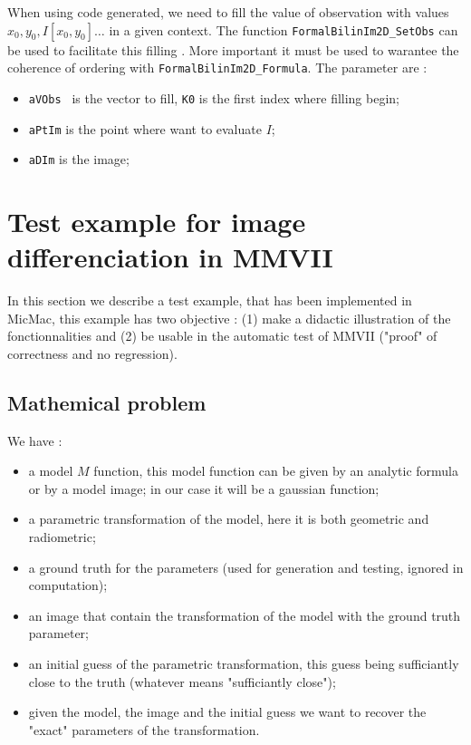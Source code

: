 When using code generated, we need to fill the value of observation with values    $x_0,y_0, I[x_0,y_0] \dots$
in a given context.  The function {\tt FormalBilinIm2D\_SetObs} can be used to facilitate this filling .
More important it must be used to warantee the coherence of ordering with  {\tt FormalBilinIm2D\_Formula}.
The parameter are :

\begin{itemize}
    \item {\tt aVObs } is the vector to fill, {\tt K0} is the first index where filling begin;
    \item {\tt aPtIm}  is the point where want to evaluate $I$;
    \item {\tt aDIm}  is the image;
\end{itemize}



\section{Test example for image differenciation in MMVII}

In this section we describe a test example, that has been implemented in MicMac, this example 
has two objective : (1) make a didactic illustration of the fonctionnalities and (2) 
be usable in the automatic test of MMVII ("proof" of correctness and no regression).

\subsection{Mathemical problem}

We have :

\begin {itemize}
    \item a model $M$  function, this model function can be given by an analytic  formula or by a model image;
          in our case it will be a gaussian function;

    \item a parametric transformation of the model, here it is both geometric and radiometric;

    \item a ground truth for the parameters (used for generation and testing, ignored in computation);

    \item an image that contain the transformation of the model with the ground truth parameter;

    \item an initial guess of the parametric transformation, this guess being sufficiantly close to the
	    truth (whatever means "sufficiantly close");

     \item given the model, the image and the initial guess we want to recover the "exact" parameters of the 
           transformation.

\end {itemize}

